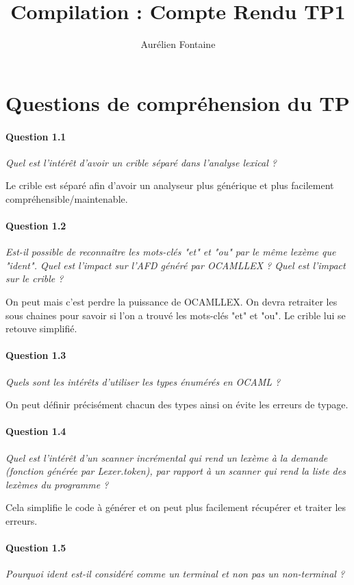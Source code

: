 \documentclass[10pt,a4paper]{article}
\author{Aurélien Fontaine}
\title{Compilation : Compte Rendu TP1}
\begin{document}
	
	\maketitle
	
	\section{Questions de compréhension du TP}
	
	\paragraph{Question 1.1} \textit{Quel est l'intérêt d'avoir un crible séparé dans l'analyse lexical ?}
	
	Le crible est séparé afin d'avoir un analyseur plus générique et plus facilement compréhensible/maintenable.
	
	\paragraph{Question 1.2} \textit{Est-il possible de reconnaître les mots-clés "et" et "ou" par le même lexème que "ident". Quel est l'impact sur l'AFD généré par OCAMLLEX ? Quel est l'impact sur le crible ?}
	
	On peut mais c'est perdre la puissance de OCAMLLEX. On devra retraiter les sous chaines pour savoir si l'on a trouvé les mots-clés "et" et "ou". Le crible lui se retouve simplifié.
	
	\paragraph{Question 1.3} \textit{Quels sont les intérêts d'utiliser les types énumérés en OCAML ?}
	
	On peut définir précisément chacun des types ainsi on évite les erreurs de typage.
	
	\paragraph{Question 1.4} \textit{Quel est l'intérêt d'un scanner incrémental qui rend un lexème à la demande (fonction générée par \emph{Lexer.token}), par rapport à un scanner qui rend la liste des lexèmes du programme ?}
	
	Cela simplifie le code à générer et on peut plus facilement récupérer et traiter les erreurs.
	
	\paragraph{Question 1.5} \textit{Pourquoi ident est-il considéré comme un terminal et non pas un non-terminal ?}
	
\end{document}
